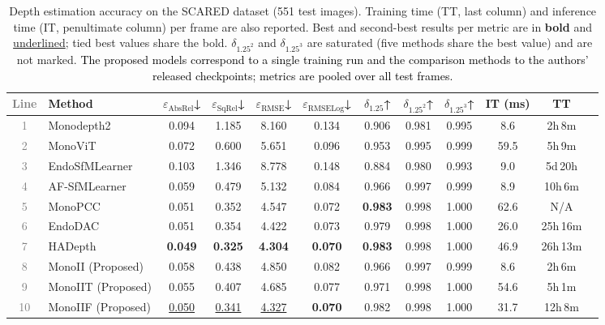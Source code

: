 \documentclass[a4paper,fleqn]{cas-dc}
\begin{document}
\begin{table}[!hbt]
\centering
\begin{tabular}{clcccccccccc}
\toprule
\textcolor{gray}{Line} & Method & $\varepsilon_\text{AbsRel}$↓ & 
        $\varepsilon_\text{SqRel}$↓ & 
        $\varepsilon_\text{RMSE}$↓ & 
        $\varepsilon_\text{RMSELog}$↓ & 
        $\delta_{1.25}$↑ & 
        $\delta_{1.25^2}$↑ & 
        $\delta_{1.25^3}$↑ & 
        IT (ms) & TT \\
\midrule
\textcolor{gray}{1} & Monodepth2     & 0.094 & 1.185 & 8.160 & 0.134 & 0.906 & 0.981 & 0.995 & 8.6  & 2h\,8m  \\
\textcolor{gray}{2} &MonoViT        & 0.072 & 0.600 & 5.651 & 0.096 & 0.953 & 0.995 & 0.999 & 59.5 & 5h\,9m  \\
\textcolor{gray}{3} &EndoSfMLearner & 0.103 & 1.346 & 8.778 & 0.148 & 0.884 & 0.980 & 0.993 & 9.0  & 5d\,20h \\
\textcolor{gray}{4} &AF-SfMLearner  & 0.059 & 0.479 & 5.132 & 0.084 & 0.966 & 0.997 & 0.999 & 8.9  & 10h\,6m \\
\textcolor{gray}{5} &MonoPCC        & 0.051 & 0.352 & 4.547 & 0.072 & \textbf{0.983} & 0.998 & 1.000 & 62.6 & N/A \\
\textcolor{gray}{6} &EndoDAC        & 0.051 & 0.354 & 4.422 & 0.073 & 0.979 & 0.998 & 1.000 & 26.0 & 25h\,16m\\
\textcolor{gray}{7} &HADepth        & \textbf{0.049} & \textbf{0.325} & \textbf{4.304} & \textbf{0.070} & \textbf{0.983} & 0.998 & 1.000 & 46.9 & 26h\,13m\\
\midrule
\textcolor{gray}{8} &MonoII  (Proposed) & 0.058 & 0.438 & 4.850 & 0.082 & 0.966 & 0.997 & 0.999 & 8.6  & 2h\,6m  \\
\textcolor{gray}{9} &MonoIIT (Proposed) & 0.055 & 0.407 & 4.685 & 0.077 & 0.971 & 0.998 & 1.000 & 54.6 & 5h\,1m  \\
\textcolor{gray}{10} &MonoIIF (Proposed) & \underline{0.050} & \underline{0.341} & \underline{4.327} & \textbf{0.070} & 0.982 & 0.998 & 1.000 & 31.7 & 12h\,8m \\
\bottomrule
\end{tabular}
\caption{Depth estimation accuracy on the SCARED dataset 
(551 test images). Training time (TT, last column) and inference time (IT, penultimate column)
per frame are also reported. Best and second-best 
results per metric are in \textbf{bold} and 
\underline{underlined}; tied best values share the bold. $\delta_{1.25^2}$ and $\delta_{1.25^3}$ are saturated (five methods share the best value) and are not marked. \textcolor{black}{The proposed models correspond to a single training run and the comparison methods to the authors' released checkpoints; metrics are pooled over all test frames.}}
\label{tab:quant_scared}
\end{table}
\end{document}
